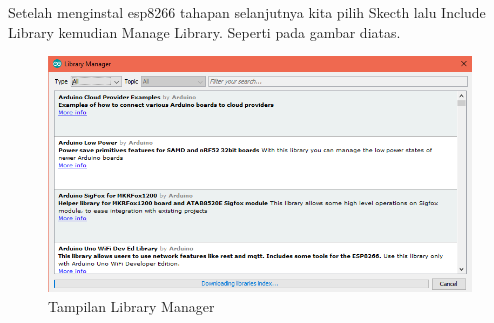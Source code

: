 \begin{enumerate}
    \par Setelah menginstal esp8266 tahapan selanjutnya kita pilih Skecth lalu Include Library kemudian Manage Library. Seperti pada gambar diatas.
    \begin{figure}[H]
    \centering
    \includegraphics[width=1\textwidth]{figures/manager7.png}
    \caption{Tampilan Library Manager}
    \label{print}
    \end{figure}
    

\end{enumerate}
